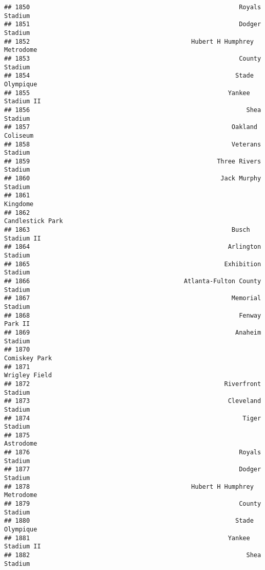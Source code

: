 \documentclass[]{article}
\begin{document}
\begin{verbatim}
## 1850                                                         Royals Stadium
## 1851                                                         Dodger Stadium
## 1852                                            Hubert H Humphrey Metrodome
## 1853                                                         County Stadium
## 1854                                                        Stade Olympique
## 1855                                                      Yankee Stadium II
## 1856                                                           Shea Stadium
## 1857                                                       Oakland Coliseum
## 1858                                                       Veterans Stadium
## 1859                                                   Three Rivers Stadium
## 1860                                                    Jack Murphy Stadium
## 1861                                                               Kingdome
## 1862                                                       Candlestick Park
## 1863                                                       Busch Stadium II
## 1864                                                      Arlington Stadium
## 1865                                                     Exhibition Stadium
## 1866                                          Atlanta-Fulton County Stadium
## 1867                                                       Memorial Stadium
## 1868                                                         Fenway Park II
## 1869                                                        Anaheim Stadium
## 1870                                                          Comiskey Park
## 1871                                                          Wrigley Field
## 1872                                                     Riverfront Stadium
## 1873                                                      Cleveland Stadium
## 1874                                                          Tiger Stadium
## 1875                                                              Astrodome
## 1876                                                         Royals Stadium
## 1877                                                         Dodger Stadium
## 1878                                            Hubert H Humphrey Metrodome
## 1879                                                         County Stadium
## 1880                                                        Stade Olympique
## 1881                                                      Yankee Stadium II
## 1882                                                           Shea Stadium

\end{verbatim}
\end{document}
